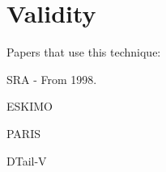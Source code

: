 \section{Validity} 
\label{sec:val}

Papers that use this technique:

SRA\cite{sra} - From 1998.

ESKIMO\cite{eskimo}

PARIS\cite{rioparis}

DTail-V\cite{dtail}
